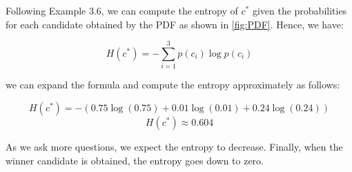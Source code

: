 \begin{comment}
    \State Let $Q_{c^*}$ be the set of questions contributing to the score of $c^*$
    \State Initialize $max\_score \gets -\infty$
    \For{each question $Q \in Q_{c^*}$}
        \State $score(Q) \gets \text{evaluate\_question}(Q)$
        \If{$score(Q) > max\_score$}
            \State $max\_score \gets score(Q)$
            \State $Q^* \gets Q$  \Comment{Update best question}
        \EndIf
    \EndFor
    
    \State \textbf{return} $Q^*$
\end{algorithmic}
\end{algorithm}

\end{comment}

\begin{example}
    Following Example 3.6, we can compute the entropy of \( c^* \) given the probabilities for each candidate obtained by the PDF as shown in \autoref{fig:PDF}. Hence, we have:

    \[
    H(c^*) = - \sum_{i=1}^{3} p(c_i) \log p(c_i)
    \]

    we can expand the formula and compute the entropy approximately as follows:

    \[
    H(c^*) = - \left( 0.75 \log(0.75) + 0.01 \log(0.01) + 0.24 \log(0.24) \right)
    \]
    \[
    H(c^*) \approx \text{0.604}
    \]
\end{example}

As we ask more questions, we expect the entropy to decrease. Finally, when the winner candidate is obtained, the entropy goes down to zero. 

